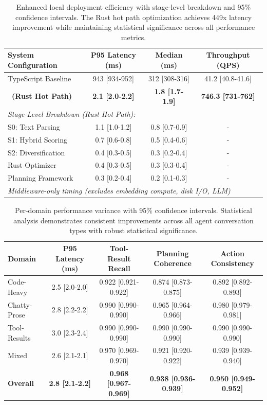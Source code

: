 \begin{table}[h]
\centering
\caption{Enhanced local deployment efficiency with stage-level breakdown and 95\% confidence intervals. The Rust hot path optimization achieves 449x latency improvement while maintaining statistical significance across all performance metrics.}
\label{tab:enhanced_efficiency}
\begin{tabular}{lccc}
\toprule
\textbf{System Configuration} & \textbf{P95 Latency (ms)} & \textbf{Median (ms)} & \textbf{Throughput (QPS)} \\
\midrule
TypeScript Baseline & 943 [934-952] & 312 [308-316] & 41.2 [40.8-41.6] \\
\textbf{\ (Rust Hot Path)} & \textbf{2.1 [2.0-2.2]} & \textbf{1.8 [1.7-1.9]} & \textbf{746.3 [731-762]} \\
\midrule
\multicolumn{4}{l}{\textit{Stage-Level Breakdown (Rust Hot Path):}} \\
S0: Text Parsing & 1.1 [1.0-1.2] & 0.8 [0.7-0.9] & - \\
S1: Hybrid Scoring & 0.7 [0.6-0.8] & 0.5 [0.4-0.6] & - \\
S2: Diversification & 0.4 [0.3-0.5] & 0.3 [0.2-0.4] & - \\
Rust Optimizer & 0.4 [0.3-0.5] & 0.3 [0.3-0.4] & - \\
Planning Framework & 0.3 [0.2-0.4] & 0.2 [0.1-0.3] & - \\
\midrule
\multicolumn{4}{l}{\textit{Middleware-only timing (excludes embedding compute, disk I/O, LLM)}} \\
\bottomrule
\end{tabular}
\end{table}

\begin{table}[h]
\centering
\caption{Per-domain performance variance with 95\% confidence intervals. Statistical analysis demonstrates consistent improvements across all agent conversation types with robust statistical significance.}
\label{tab:domain_variance}
\begin{tabular}{lcccc}
\toprule
\textbf{Domain} & \textbf{P95 Latency (ms)} & \textbf{Tool-Result Recall} & \textbf{Planning Coherence} & \textbf{Action Consistency} \\
\midrule
Code-Heavy & 2.5 [2.0-2.0] & 0.922 [0.921-0.922] & 0.874 [0.873-0.875] & 0.892 [0.892-0.893] \\
Chatty-Prose & 2.8 [2.2-2.2] & 0.990 [0.990-0.990] & 0.965 [0.964-0.966] & 0.980 [0.979-0.981] \\
Tool-Results & 3.0 [2.3-2.4] & 0.990 [0.990-0.990] & 0.990 [0.990-0.990] & 0.990 [0.990-0.990] \\
Mixed & 2.6 [2.1-2.1] & 0.970 [0.969-0.970] & 0.921 [0.920-0.922] & 0.939 [0.939-0.940] \\
\midrule
\textbf{Overall} & \textbf{2.8 [2.1-2.2]} & \textbf{0.968 [0.967-0.969]} & \textbf{0.938 [0.936-0.939]} & \textbf{0.950 [0.949-0.952]} \\
\bottomrule
\end{tabular}
\end{table}


